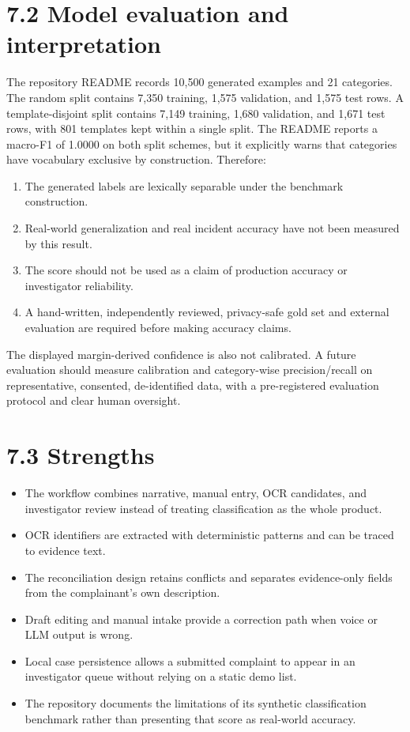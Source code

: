 \documentclass[12pt,a4paper,oneside]{report}
\begin{document}
\section{7.2 Model evaluation and interpretation}
The repository README records 10,500 generated examples and 21 categories. The random split contains 7,350 training, 1,575 validation, and 1,575 test rows. A template-disjoint split contains 7,149 training, 1,680 validation, and 1,671 test rows, with 801 templates kept within a single split. The README reports a macro-F1 of 1.0000 on both split schemes, but it explicitly warns that categories have vocabulary exclusive by construction. Therefore:

\begin{enumerate}
\item The generated labels are lexically separable under the benchmark construction.
\item Real-world generalization and real incident accuracy have not been measured by this result.
\item The score should not be used as a claim of production accuracy or investigator reliability.
\item A hand-written, independently reviewed, privacy-safe gold set and external evaluation are required before making accuracy claims.
\end{enumerate}
The displayed margin-derived confidence is also not calibrated. A future evaluation should measure calibration and category-wise precision/recall on representative, consented, de-identified data, with a pre-registered evaluation protocol and clear human oversight.

\section{7.3 Strengths}
\begin{itemize}
\item The workflow combines narrative, manual entry, OCR candidates, and investigator review instead of treating classification as the whole product.
\item OCR identifiers are extracted with deterministic patterns and can be traced to evidence text.
\item The reconciliation design retains conflicts and separates evidence-only fields from the complainant's own description.
\item Draft editing and manual intake provide a correction path when voice or LLM output is wrong.
\item Local case persistence allows a submitted complaint to appear in an investigator queue without relying on a static demo list.
\item The repository documents the limitations of its synthetic classification benchmark rather than presenting that score as real-world accuracy.
\end{itemize}
\end{document}
